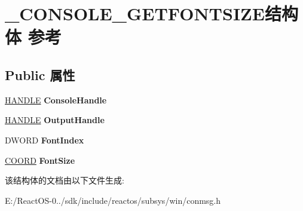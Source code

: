 \hypertarget{struct___c_o_n_s_o_l_e___g_e_t_f_o_n_t_s_i_z_e}{}\section{\+\_\+\+C\+O\+N\+S\+O\+L\+E\+\_\+\+G\+E\+T\+F\+O\+N\+T\+S\+I\+Z\+E结构体 参考}
\label{struct___c_o_n_s_o_l_e___g_e_t_f_o_n_t_s_i_z_e}
\subsection*{Public 属性}
\begin{DoxyCompactItemize}
\item 
\mbox{\label{struct___c_o_n_s_o_l_e___g_e_t_f_o_n_t_s_i_z_e_a672d3f60a97b75275a021f1317227e6d}} 
\hyperlink{interfacevoid}{H\+A\+N\+D\+LE} {\bfseries Console\+Handle}
\item 
\mbox{\label{struct___c_o_n_s_o_l_e___g_e_t_f_o_n_t_s_i_z_e_ab2a924cddb656544553f7db4866ede93}} 
\hyperlink{interfacevoid}{H\+A\+N\+D\+LE} {\bfseries Output\+Handle}
\item 
\mbox{\label{struct___c_o_n_s_o_l_e___g_e_t_f_o_n_t_s_i_z_e_a1a8278d58ac5c759831e0b28d4fdef86}} 
D\+W\+O\+RD {\bfseries Font\+Index}
\item 
\mbox{\label{struct___c_o_n_s_o_l_e___g_e_t_f_o_n_t_s_i_z_e_a02691681c138b4ab9c405277972c64e5}} 
\hyperlink{struct___c_o_o_r_d}{C\+O\+O\+RD} {\bfseries Font\+Size}
\end{DoxyCompactItemize}


该结构体的文档由以下文件生成\+:\begin{DoxyCompactItemize}
\item 
E\+:/\+React\+O\+S-\/0../sdk/include/reactos/subsys/win/conmsg.\+h\end{DoxyCompactItemize}
